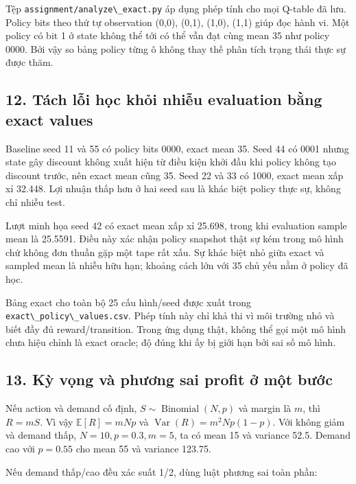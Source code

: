 Tệp \passthrough{\lstinline!assignment/analyze\_exact.py!} áp dụng phép
tính cho mọi Q-table đã lưu. Policy bits theo thứ tự observation (0,0),
(0,1), (1,0), (1,1) giúp đọc hành vi. Một policy có bit 1 ở state không
thể tới có thể vẫn đạt cùng mean 35 như policy 0000. Bởi vậy so bảng
policy từng ô không thay thế phân tích trạng thái thực sự được thăm.

\subsection{12. Tách lỗi học khỏi nhiễu evaluation bằng exact
values}\label{tuxe1ch-lux1ed7i-hux1ecdc-khux1ecfi-nhiux1ec5u-evaluation-bux1eb1ng-exact-values}

Baseline seed 11 và 55 có policy bits 0000, exact mean 35. Seed 44 có
0001 nhưng state gây discount không xuất hiện từ điều kiện khởi đầu khi
policy không tạo discount trước, nên exact mean cũng 35. Seed 22 và 33
có 1000, exact mean xấp xỉ 32.448. Lợi nhuận thấp hơn ở hai seed sau là
khác biệt policy thực sự, không chỉ nhiễu test.

Lượt minh họa seed 42 có exact mean xấp xỉ 25.698, trong khi evaluation
sample mean là 25.5591. Điều này xác nhận policy snapshot thật sự kém
trong mô hình chứ không đơn thuần gặp một tape rất xấu. Sự khác biệt nhỏ
giữa exact và sampled mean là nhiễu hữu hạn; khoảng cách lớn với 35 chủ
yếu nằm ở policy đã học.

Bảng exact cho toàn bộ 25 cấu hình/seed được xuất trong
\passthrough{\lstinline!exact\_policy\_values.csv!}. Phép tính này chỉ
khả thi vì môi trường nhỏ và biết đầy đủ reward/transition. Trong ứng
dụng thật, không thể gọi một mô hình chưa hiệu chỉnh là exact oracle; độ
đúng khi ấy bị giới hạn bởi sai số mô hình.

\subsection{13. Kỳ vọng và phương sai profit ở một
bước}\label{kux1ef3-vux1ecdng-vuxe0-phux1b0ux1a1ng-sai-profit-ux1edf-mux1ed9t-bux1b0ux1edbc}

Nếu action và demand cố định, \(S\sim\operatorname{Binomial}(N,p)\) và
margin là \(m\), thì \(R=mS\). Vì vậy \(\mathbb E[R]=mNp\) và
\(\operatorname{Var}(R)=m^2Np(1-p)\). Với không giảm và demand thấp,
\(N=10,p=0.3,m=5\), ta có mean 15 và variance 52.5. Demand cao với
\(p=0.55\) cho mean 55 và variance 123.75.

Nếu demand thấp/cao đều xác suất 1/2, dùng luật phương sai toàn phần:

